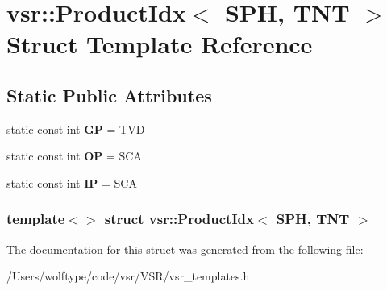 \hypertarget{structvsr_1_1_product_idx_3_01_s_p_h_00_01_t_n_t_01_4}{\section{vsr\-:\-:Product\-Idx$<$ S\-P\-H, T\-N\-T $>$ Struct Template Reference}
\label{structvsr_1_1_product_idx_3_01_s_p_h_00_01_t_n_t_01_4}
}
\subsection*{Static Public Attributes}
\begin{DoxyCompactItemize}
\item 
\hypertarget{structvsr_1_1_product_idx_3_01_s_p_h_00_01_t_n_t_01_4_a29ae05ac60caababa4197a710efbb8de}{static const int {\bfseries G\-P} = T\-V\-D}\label{structvsr_1_1_product_idx_3_01_s_p_h_00_01_t_n_t_01_4_a29ae05ac60caababa4197a710efbb8de}

\item 
\hypertarget{structvsr_1_1_product_idx_3_01_s_p_h_00_01_t_n_t_01_4_ab05d424f1c10d90115a719c01ce8c628}{static const int {\bfseries O\-P} = S\-C\-A}\label{structvsr_1_1_product_idx_3_01_s_p_h_00_01_t_n_t_01_4_ab05d424f1c10d90115a719c01ce8c628}

\item 
\hypertarget{structvsr_1_1_product_idx_3_01_s_p_h_00_01_t_n_t_01_4_a300581106242ded87e047c5022d412b9}{static const int {\bfseries I\-P} = S\-C\-A}\label{structvsr_1_1_product_idx_3_01_s_p_h_00_01_t_n_t_01_4_a300581106242ded87e047c5022d412b9}

\end{DoxyCompactItemize}
\subsubsection*{template$<$$>$ struct vsr\-::\-Product\-Idx$<$ S\-P\-H, T\-N\-T $>$}



The documentation for this struct was generated from the following file\-:\begin{DoxyCompactItemize}
\item 
/\-Users/wolftype/code/vsr/\-V\-S\-R/vsr\-\_\-templates.\-h\end{DoxyCompactItemize}
